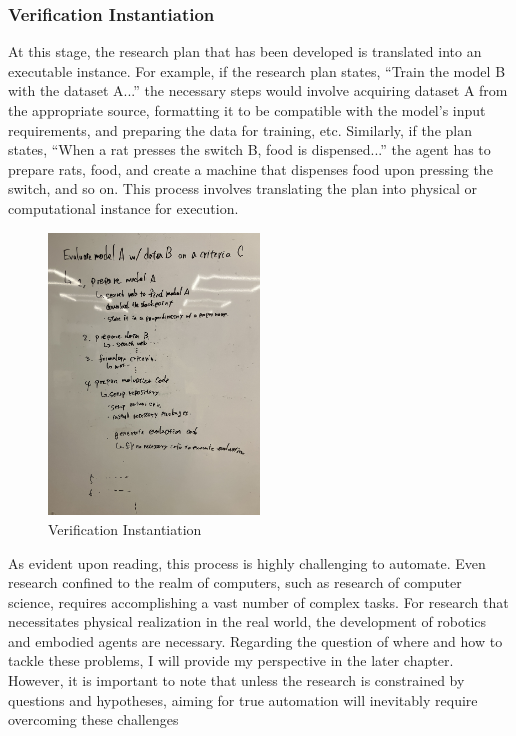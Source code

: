 \subsubsection{Verification Instantiation} 
At this stage, the research plan that has been developed is translated into an executable instance. For example, if the research plan states, ``Train the model B with the dataset A...'' the necessary steps would involve acquiring dataset A from the appropriate source, formatting it to be compatible with the model's input requirements, and preparing the data for training, etc. Similarly, if the plan states, ``When a rat presses the switch B, food is dispensed...'' the agent has to prepare rats, food, and create a machine that dispenses food upon pressing the switch, and so on. This process involves translating the plan into physical or computational instance for execution.

\begin{figure}[htb]
    \centering
    \includegraphics[width=0.5\textwidth]{figs/verification_instantiation.jpg}
    \caption{Verification Instantiation}
    \label{fig:verification_instantiation}
\end{figure}

As evident upon reading, this process is highly challenging to automate. Even research confined to the realm of computers, such as research of computer science, requires accomplishing a vast number of complex tasks. For research that necessitates physical realization in the real world, the development of robotics and embodied agents are necessary. Regarding the question of where and how to tackle these problems, I will provide my perspective in the later chapter. However, it is important to note that unless the research is constrained by questions and hypotheses, aiming for true automation will inevitably require overcoming these challenges


